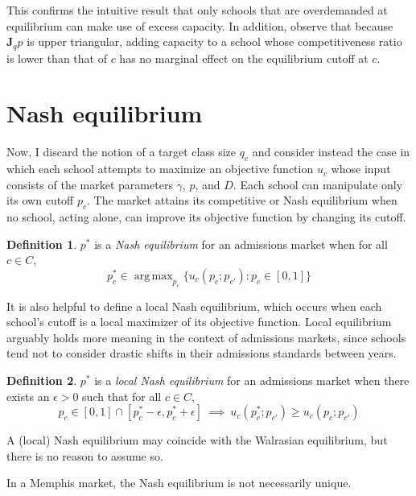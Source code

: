 \documentclass[12pt]{article}
\numberwithin{equation}{subsection}
\theoremstyle{definition}
\newtheorem{definition}{Definition}
\DeclareMathOperator*{\argmax}{arg\,max}
\begin{document}
This confirms the intuitive result that only schools that are overdemanded at equilibrium can make use of excess capacity. In addition, observe that because $\mathbf{J}_q \hat p$ is upper triangular, adding capacity to a school whose competitiveness ratio is lower than that of $c$ has no marginal effect on the equilibrium cutoff at $c$. 



\section{Nash equilibrium}
Now, I discard the notion of a target class size $q_c$ and consider instead the case in which each school attempts to maximize an objective function $u_c$ whose input consists of the market parameters $\gamma$, $p$, and $D$. Each school can manipulate only its own cutoff $p_c$. The market attains its competitive or Nash equilibrium when no school, acting alone, can improve its objective function by changing its cutoff. 

\begin{definition} \label{nasheqconditions} $p^*$ is a \emph{Nash equilibrium} for an admissions market when for all $c \in C$,
\begin{equation} p_c^* \in \argmax_{p_c}\bigl\{ u_c(p_c; p_{c'}): p_c \in [0,1] \bigr\}\end{equation}
\end{definition}

It is also helpful to define a local Nash equilibrium, which occurs when each school's cutoff is a local maximizer of its objective function. Local equilibrium arguably holds more meaning in the context of admissions markets, since schools tend not to consider drastic shifts in their admissions standards between years.

\begin{definition} \label{localnasheqconditions} $p^*$ is a \emph{local Nash equilibrium} for an admissions market when there exists an $\epsilon > 0$ such that for all $c \in C$,
\begin{equation}p_c \in [0,1] \cap [p_c^* - \epsilon,  p_c^* + \epsilon] ~\implies~ u_c(p^*_c; p_{c'}) \geq u_c(p_c; p_{c'}) \end{equation}
\end{definition}
A (local) Nash equilibrium may coincide with the Walrasian equilibrium, but there is no reason to assume so. 

In a Memphis market, the Nash equilibrium is not necessarily unique. %
\end{document}
